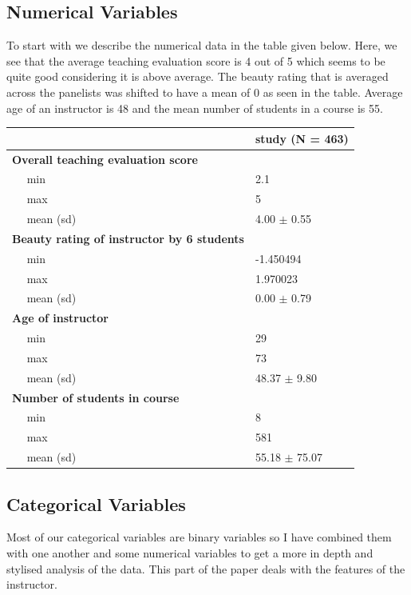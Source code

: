 \documentclass[
  12 pt,
]{article}
\begin{document}
\hypertarget{numerical-variables}{%
\subsection{Numerical Variables}\label{numerical-variables}}

To start with we describe the numerical data in the table given below. Here, we see that the average teaching evaluation score is 4 out of 5 which seems to be quite good considering it is above average. The beauty rating that is averaged across the panelists was shifted to have a mean of 0 as seen in the table. Average age of an instructor is 48 and the mean number of students in a course is 55.

\begin{tabular}{l|l}
\hline
 & study (N = 463)\\
\hline
\bf{Overall teaching evaluation score} & ~\\
\hline
~~ min & 2.1\\
\hline
~~ max & 5\\
\hline
~~ mean (sd) & 4.00 $\pm$ 0.55\\
\hline
\bf{Beauty rating of instructor by 6 students} & ~\\
\hline
~~ min & -1.450494\\
\hline
~~ max & 1.970023\\
\hline
~~ mean (sd) & 0.00 $\pm$ 0.79\\
\hline
\bf{Age of instructor} & ~\\
\hline
~~ min & 29\\
\hline
~~ max & 73\\
\hline
~~ mean (sd) & 48.37 $\pm$ 9.80\\
\hline
\bf{Number of students in course} & ~\\
\hline
~~ min & 8\\
\hline
~~ max & 581\\
\hline
~~ mean (sd) & 55.18 $\pm$ 75.07\\
\hline
\end{tabular}

\newpage

\hypertarget{categorical-variables}{%
\subsection{Categorical Variables}\label{categorical-variables}}

Most of our categorical variables are binary variables so I have combined them with one another and some numerical variables to get a more in depth and stylised analysis of the data. This part of the paper deals with the features of the instructor.
\end{document}
